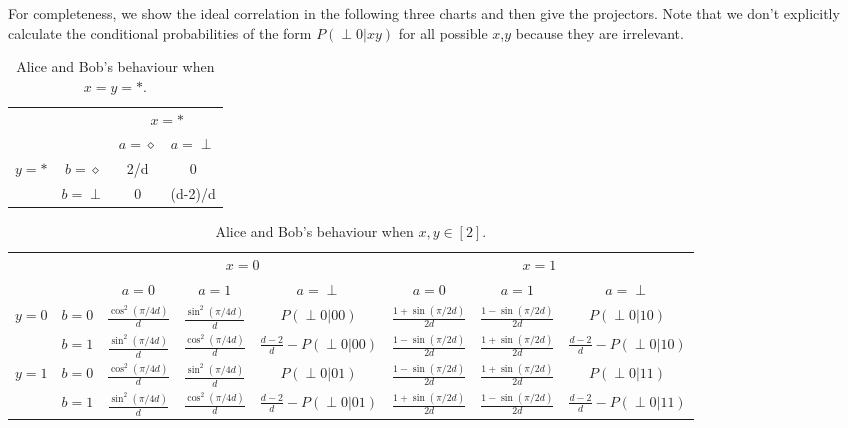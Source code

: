 \documentclass[11pt,letterpaper]{article}
\newcommand{\1}{\mathbb{1}}
\newcommand{\pr}[2]{P(#1|#2)}
\theoremstyle{definition}
\begin{document}
For completeness, we show the ideal correlation in the following three charts and then give the projectors. 
Note that we don't explicitly calculate the conditional probabilities of the form $\pr{\perp 0}{xy}$ for all possible $x$,$y$ 
because they are irrelevant.
\begin{table}[H]
\begin{center}
\begin{tabular}{|c|c||c|c|}
\hline
\multicolumn{2}{|c|}{} &
\multicolumn{2}{|c|}{$x=\ast$}\\
\cline{3-4}
\multicolumn{2}{|c|}{} &$a = \diamond$ & $a = \perp$ \\
\hline
\hline
\multirow{2}{*}{$y = \ast$} & $b=\diamond$ & 2/d & 0 \\
\cline{2-4}
&$b=\perp$ & 0 & (d-2)/d \\
\hline
\end{tabular}
\caption{Alice and Bob's behaviour when $x=y=\ast$.}
\end{center}
\end{table}

\begin{table}[H]
\begin{center}
\begin{tabular}{|c|c||c|c|c|c|c|c|}
\hline
\multicolumn{2}{|c|}{} &
\multicolumn{3}{|c|}{$x=0$}&
\multicolumn{3}{|c|}{$x=1$} \\
\cline{3-8}
\multicolumn{2}{|c|}{} &
$a = 0$ & $a=1$ & $a=\perp$ &
$a = 0$ & $a=1$ & $a=\perp$\\
\hline
\hline
\multirow{2}{*}{$y = 0$} & $b=0$ & $\frac{\cos^2(\pi/4d)}{d}$ & $\frac{\sin^2(\pi/4d)}{d}$ & \small $\pr{\perp0}{00}$ 
& $\frac{1+\sin(\pi/2d)}{2d}$ & $\frac{1-\sin(\pi/2d)}{2d}$ & \small  $\pr{\perp0}{10}$ \\
\cline{2-8}
&$b=1$ & $\frac{\sin^2(\pi/4d)}{d}$ & $\frac{\cos^2(\pi/4d)}{d}$ & $\frac{d-2}{d}-\pr{\perp0}{00}$ 
&  $\frac{1-\sin(\pi/2d)}{2d}$ & $\frac{1+\sin(\pi/2d)}{2d}$ & \small $\frac{d-2}{d} - \pr{\perp0}{10}$  \\
\hline
\multirow{2}{*}{$y = 1$} & $b=0$ & $\frac{\cos^2(\pi/4d)}{d}$ & $\frac{\sin^2(\pi/4d)}{d}$ & \small $\pr{\perp0}{01}$ & 
$ \frac{1-\sin(\pi/2d)}{2d}$ & $ \frac{1+\sin(\pi/2d)}{2d}$ & \small $\pr{\perp 0}{11}$  \\
\cline{2-8}
&$b=1$ & $\frac{\sin^2(\pi/4d)}{d}$ & $\frac{\cos^2(\pi/4d)}{d}$ & \small $\frac{d-2}{d}-\pr{\perp0}{01}$ &  
$ \frac{1+\sin(\pi/2d)}{2d}$ & $ \frac{1-\sin(\pi/2d)}{2d}$ & \small $\frac{d-2}{d}- \pr{\perp 0}{11}$ \\
\hline
\end{tabular}
\end{center}
\caption{Alice and Bob's behaviour when $x,y \in [2]$.}
\end{table}
\end{document}
